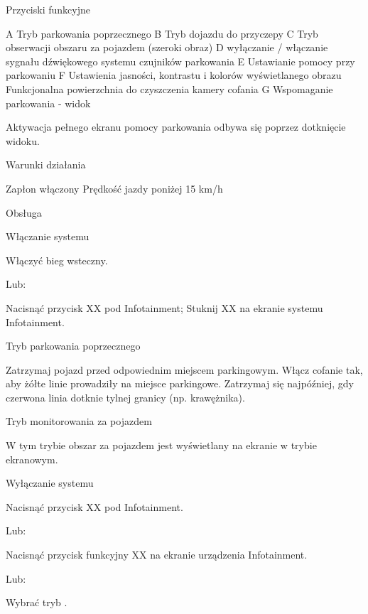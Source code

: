 Przyciski funkcyjne

A Tryb parkowania poprzecznego
B Tryb dojazdu do przyczepy
C Tryb obserwacji obszaru za pojazdem (szeroki obraz)
D wyłączanie / włączanie sygnału dźwiękowego systemu czujników parkowania
E Ustawianie pomocy przy parkowaniu
F Ustawienia jasności, kontrastu i kolorów wyświetlanego obrazu
Funkcjonalna powierzchnia do czyszczenia kamery cofania
G Wspomaganie parkowania - widok

Aktywacja pełnego ekranu pomocy parkowania odbywa się poprzez dotknięcie widoku.

Warunki działania
\begin{itemizeTick}
	\itemTick Zapłon włączony
	\itemTick Prędkość jazdy poniżej 15 km/h
\end{itemizeTick}

Obsługa

Włączanie systemu
\begin{itemizeArrow}
	\itemArrow Włączyć bieg wsteczny.
\end{itemizeArrow}
Lub:
\begin{itemizeArrow}
	\itemArrow Nacisnąć przycisk XX pod Infotainment; Stuknij XX na ekranie systemu Infotainment.
\end{itemizeArrow}

Tryb parkowania poprzecznego
\begin{itemizeArrow}
	\itemArrow Zatrzymaj pojazd przed odpowiednim miejscem parkingowym.
	\itemArrow Włącz cofanie tak, aby żółte linie prowadziły na miejsce parkingowe.
	\itemArrow Zatrzymaj się najpóźniej, gdy czerwona linia dotknie tylnej granicy (np. krawężnika).
\end{itemizeArrow}

Tryb monitorowania za pojazdem

W tym trybie obszar za pojazdem jest wyświetlany na ekranie w trybie ekranowym.

Wyłączanie systemu

\begin{itemizeArrow}
	\itemArrow Nacisnąć przycisk XX pod Infotainment.
\end{itemizeArrow}
Lub:
\begin{itemizeArrow}
	\itemArrow Nacisnąć przycisk funkcyjny XX na ekranie urządzenia Infotainment.
\end{itemizeArrow}
Lub:
\begin{itemizeArrow}
	\itemArrow Wybrać tryb \gearP.
\end{itemizeArrow}


